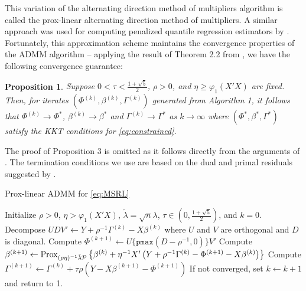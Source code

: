 \documentclass[12pt]{article}
\newtheorem{prop}{Proposition}
\begin{document}
This variation of the alternating direction method of multipliers algorithm is called the prox-linear alternating direction method of multipliers. A similar approach was used for computing penalized quantile regression estimators by \citet{gu2018admm}. Fortunately, this approximation scheme maintains the convergence properties of the ADMM algorithm -- applying the result of Theorem 2.2 from \citet{deng2016global}, we have the following convergence guarantee:
\begin{prop}\citep{deng2016global}
Suppose $0 < \tau < \frac{1 + \sqrt{5}}{2}$, $\rho > 0$, and $\eta \geq \varphi_{1}(X'X)$ are fixed. Then, for iterates $(\Phi^{(k)}, \beta^{(k)}, \Gamma^{(k)})$ generated from Algorithm 1, it follows that $\Phi^{(k)} \to \Phi^*$, $\beta^{(k)} \to \beta^{*}$ and $\Gamma^{(k)} \to \Gamma^{*}$ as $k \to \infty$ where $(\Phi^{*}, \beta^{*}, \Gamma^{*})$ satisfy the KKT conditions for \eqref{eq:constrained}.
\end{prop}\label{conv_prop}
The proof of Proposition 3 is omitted as it follows directly from the arguments of \citet{deng2016global}. 
The termination conditions we use are based on the dual and primal residuals suggested by \citet{boyd2011distributed}.

\begin{algorithm}[t!]
\caption{Prox-linear ADMM for \eqref{eq:MSRL}}
\begin{spacing}{1.15}
\begin{algorithmic}[1]
\Require Initialize $\rho > 0$, $\eta > \varphi_1(X'X)$, $\tilde{\lambda} = \sqrt{n}\lambda$, $\tau \in (0, \frac{1 + \sqrt{5}}{2})$, and $k=0$.
\State Decompose $UDV' \leftarrow Y + \rho^{-1}\Gamma^{(k)} - X\beta^{(k)}$ where $U$ and $V$ are orthogonal and $D$ is diagonal. 
\State Compute $\Phi^{(k+1)} \leftarrow U \{ \texttt{pmax}(D - \rho^{-1}, 0) \} V'$
\State Compute $\beta^{(k+1)} \leftarrow {\rm Prox}_{(\rho \eta)^{-1}\tilde{\lambda} \mathcal{P}} \left\{ \beta^{(k)} + \eta^{-1} X'\left(Y + \rho^{-1} \Gamma^{(k)} - \Phi^{(k+1)} - X\beta^{(k)}\right)\right\}$
\State Compute $\Gamma^{(k+1)} \leftarrow \Gamma^{(k)} + \tau \rho(Y - X\beta^{(k+1)} - \Phi^{(k+1)})$
\State If not converged, set $k \leftarrow k + 1$ and return to 1. 
\end{algorithmic}
\end{spacing}
\end{algorithm}
\end{document}
